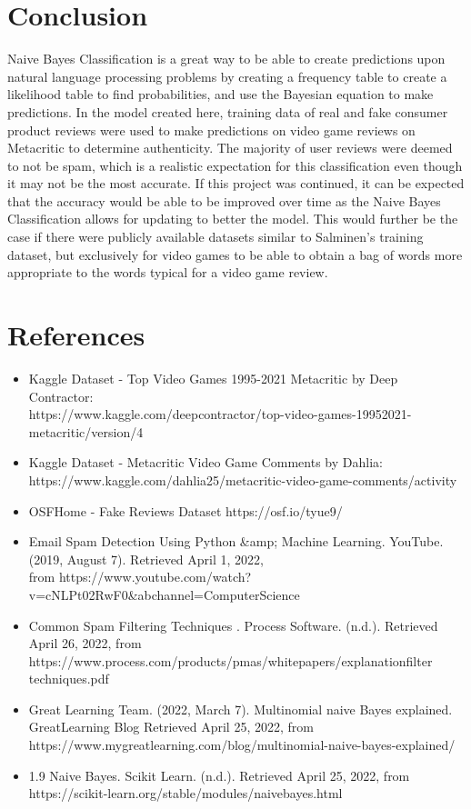 \documentclass{article}
\begin{document}
\section{Conclusion}
\hspace{\parindent} Naive Bayes Classification is a great way to be able to create predictions upon natural language processing problems by creating a frequency table to create a likelihood table to find probabilities, and use the Bayesian equation to make predictions. In the model created here, training data of real and fake consumer product reviews were used to make predictions on video game reviews on Metacritic to determine authenticity. The majority of user reviews were deemed to not be spam, which is a realistic expectation for this classification even though it may not be the most accurate. If this project was continued, it can be expected that the accuracy would be able to be improved over time as the Naive Bayes Classification allows for updating to better the model. This would further be the case if there were publicly available datasets similar to Salminen's training dataset, but exclusively for video games to be able to obtain a bag of words more appropriate to the words typical for a video game review.
\pagebreak
\section{References}
\begin{itemize}
    \item Kaggle Dataset - Top Video Games 1995-2021 Metacritic by Deep Contractor:\\ https://www.kaggle.com/deepcontractor/top-video-games-19952021-metacritic/version/4
    \item Kaggle Dataset - Metacritic Video Game Comments by Dahlia:\\ https://www.kaggle.com/dahlia25/metacritic-video-game-comments/activity
    \item OSFHome - Fake Reviews Dataset https://osf.io/tyue9/
    \item Email Spam Detection Using Python &amp; Machine Learning. YouTube. (2019, August 7). Retrieved April 1, 2022, \\from https://www.youtube.com/watch?v=cNLPt02RwF0&ab\textunderscore channel=ComputerScience
    \item Common Spam Filtering Techniques . Process Software. (n.d.). Retrieved April 26, 2022, from https://www.process.com/products/pmas/whitepapers/explanation\textunderscore filter \textunderscore techniques.pdf
    \item Great Learning Team. (2022, March 7). Multinomial naive Bayes explained. GreatLearning Blog Retrieved April 25, 2022, from \\ https://www.mygreatlearning.com/blog/multinomial-naive-bayes-explained/ 
    \item 1.9 Naive Bayes. Scikit Learn. (n.d.). Retrieved April 25, 2022, from  https://scikit-learn.org/stable/modules/naive\textunderscore bayes.html
\end{itemize}
\end{document}
